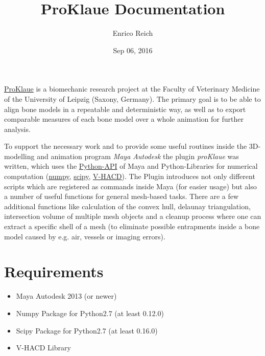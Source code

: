 \documentclass[letterpaper,10pt,english]{sphinxmanual}
\title{ProKlaue Documentation}
\date{Sep 06, 2016}
\author{Enrico Reich}
\begin{document}
\maketitle
\tableofcontents
{}\label{index::doc}

\label{index:module-proKlaue}
\href{http://www.zv.uni-leipzig.de/service/kommunikation/medienredaktion/nachrichten.html?ifab\_modus=detail\&ifab\_id=6004}{ProKlaue} is a biomechanic research project at the Faculty of Veterinary Medicine of the University of Leipzig (Saxony, Germany). The primary goal is to be able to align bone models in a repeatable and deterministic way, as well as to export comparable measures of each bone model over a whole animation for further analysis.

To support the necessary work and to provide some useful routines inside the 3D-modelling and animation program \emph{Maya Autodesk} the plugin \emph{proKlaue} was written, which uses the \href{http://download.autodesk.com/us/maya/2011help/CommandsPython/}{Python-API} of Maya and Python-Libraries for numerical computation (\href{http://www.numpy.org/}{numpy}, \href{https://www.scipy.org/}{scipy}, \href{https://github.com/kmammou/v-hacd}{V-HACD}). The Plugin introduces not only different scripts which are registered as commands inside Maya (for easier usage) but also a number of useful functions for general mesh-based tasks. There are a few additional functions like calculation of the convex hull, delaunay triangulation, intersection volume of multiple mesh objects and a cleanup process where one can extract a specific shell of a mesh (to eliminate possible entrapments inside a bone model caused by e.g. air, vessels or imaging errors).


\chapter{Requirements}
\label{index:welcome-to-proklaue-s-documentation}\label{index:main}\label{index:requirements}\label{index:module-proKlaue}\begin{itemize}
\item {} 
Maya Autodesk 2013 (or newer)

\item {} 
Numpy Package for Python2.7 (at least 0.12.0)

\item {} 
Scipy Package for Python2.7 (at least 0.16.0)

\item {} 
V-HACD Library

\end{itemize}
\end{document}
